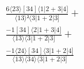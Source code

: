 \documentclass[varwidth, border=5pt]{standalone}
\begin{document}
\begin{my}
$\begin{gathered}
\scriptscriptstyle\frac{6⟨23⟩[34]⟨1|2+3|4]}{⟨13⟩²⟨3|1+2|3]} +\\
\scriptscriptstyle\frac{-1[34]⟨2|1+3|4]}{⟨13⟩⟨3|1+2|3]} +\\
\scriptscriptstyle\frac{-1⟨24⟩[34]⟨3|1+2|4]}{⟨13⟩⟨34⟩⟨3|1+2|3]} \phantom{+}
\end{gathered}$
\end{my}
\end{document}
